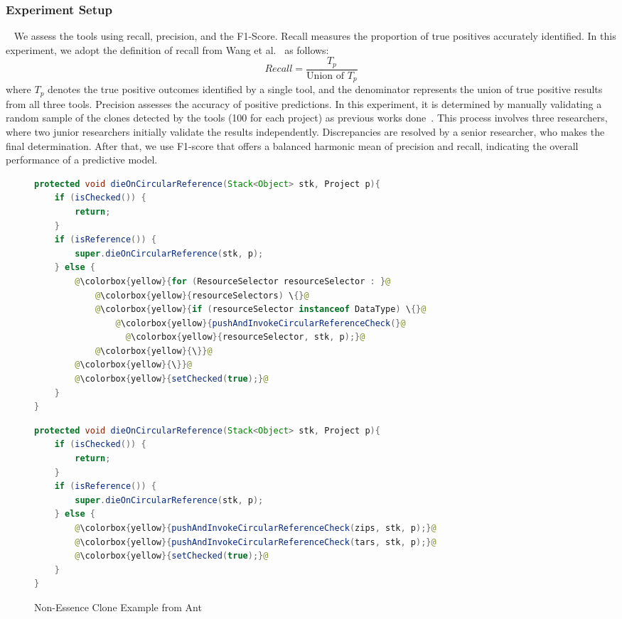 \subsubsection{Experiment Setup}~\label{sec:ec-setup}
We assess the tools using recall, precision, and the F1-Score. Recall measures the proportion of true positives accurately identified. In this experiment, we adopt the definition of recall from Wang et al.~\cite{wang2018ccaligner} as follows:
$$
Recall = \frac{T_p}{\text{Union of }T_p}
$$
where $T_p$ denotes the true positive outcomes identified by a single tool, and the denominator represents the union of true positive results from all three tools. 
Precision assesses the accuracy of positive predictions. 
In this experiment, it is determined by manually validating a random sample of the clones detected by the tools (100 for each project) as previous works done~\cite{nil2021}. 
This process involves three researchers, where two junior researchers initially validate the results independently. 
Discrepancies are resolved by a senior researcher, who makes the final determination. 
After that, we use F1-score that offers a balanced harmonic mean of precision and recall, indicating the overall performance of a predictive model.

\begin{figure*}[htbp]
\begin{minipage}[t]{0.49\textwidth}
\begin{lstlisting}[escapechar=@, language=Java]
protected void dieOnCircularReference(Stack<Object> stk, Project p){
    if (isChecked()) {
        return;
    }
    if (isReference()) {
        super.dieOnCircularReference(stk, p);
    } else {
        @\colorbox{yellow}{for (ResourceSelector resourceSelector : }@
            @\colorbox{yellow}{resourceSelectors) \{}@
            @\colorbox{yellow}{if (resourceSelector instanceof DataType) \{}@
                @\colorbox{yellow}{pushAndInvokeCircularReferenceCheck(}@
                  @\colorbox{yellow}{resourceSelector, stk, p);}@
            @\colorbox{yellow}{\}}@
        @\colorbox{yellow}{\}}@
        @\colorbox{yellow}{setChecked(true);}@
    }
}
\end{lstlisting}
\end{minipage}
\hfill 
\begin{minipage}[t]{0.49\textwidth}
\begin{lstlisting}[escapechar=@, language=Java]
protected void dieOnCircularReference(Stack<Object> stk, Project p){
    if (isChecked()) {
        return;
    }
    if (isReference()) {
        super.dieOnCircularReference(stk, p);
    } else {
        @\colorbox{yellow}{pushAndInvokeCircularReferenceCheck(zips, stk, p);}@
        @\colorbox{yellow}{pushAndInvokeCircularReferenceCheck(tars, stk, p);}@
        @\colorbox{yellow}{setChecked(true);}@
    }
}

\end{lstlisting}
\end{minipage}
\caption{Non-Essence Clone Example from Ant}
\label{fig:not-ec}
\end{figure*}

